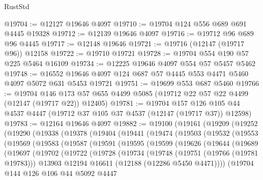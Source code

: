 \begin{lexlean}{RustStd}
\begin{coremodule}
@19704 := @12127 @19646 @4097
@19710 := @19704 @124 @556 @689 @691 @4445 @19328
@19712 := @12139 @19646 @4097
@19716 := @19712 @96 @689 @96 @4445
@19717 := @12148 @19646
@19721 := @19716 (@12147 (@19717 @96)) @12158
@19722 := @19710 @19721
@19728 := @19704 @554 @190 @57 @225 @5464 @16109
@19734 := @12225 @19646 @4097 @554 @57 @5457 @5462
@19748 := @16552 @19646 @4097 @124 @687 @57 @4445 @553 @4471 @5460 @4097 @5072 @631 @5453 @19721
@19751 := @19699 @553 @687 @5460
@19766 := @19704
    @146
    @173
    @57
    @655
    @4499
    @5085
    (@19712 @22 @57 @22 @4499 (@12147 (@19717 @22)) @12405)
@19781 := @19704
    @157
    @126
    @105
    @44
    @4537
    @4447
    (@19712 @37 @105 @37 @4537 (@12147 (@19717 @37)) @12598)
@19783 := @12164 @19646 @4097
@19882 := @19100
    (@19161
      (@19209
        (@19252
          (@19290
            (@19338
              (@19378
                (@19404
                  (@19441
                    (@19474
                      (@19503
                        (@19532
                          (@19553
                            (@19569
                              (@19583
                                (@19587
                                  (@19591
                                    (@19595
                                      (@19599
                                        (@19626
                                          (@19644
                                            (@19689
                                              (@19697
                                                (@19702
                                                  (@19722
                                                    (@19728
                                                      (@19734
                                                        (@19748
                                                          (@19751 (@19766 (@19781 @19783)))
                                                          @13903
                                                          @12194
                                                          @16611
                                                          (@12188 (@12286 @5450 @4471))))
                                                      (@19704
                                                        @144
                                                        @126
                                                        @106
                                                        @44
                                                        @5092
                                                        @4447

\end{coremodule}
\end{lexlean}
